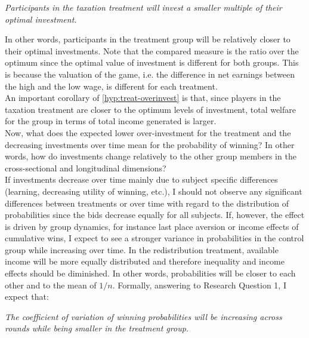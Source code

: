     \begin{tcolorbox}[colback=UniVieGrau!15!white, colframe=white] 
    \begin{hyp} \label{hyp:treat-overinvest}
    \textit{Participants in the taxation treatment will invest a smaller multiple of their optimal investment.}
    \end{hyp}
    \end{tcolorbox}
    
    In other words, participants in the treatment group will be relatively closer to their optimal investments. Note that the compared measure is the ratio over the optimum since the optimal value of investment is different for both groups. This is because the valuation of the game, i.e. the difference in net earnings between the high and the low wage, is different for each treatment.\\ 
      
    An important corollary of \cref{hyp:treat-overinvest} is that, since players in the taxation treatment are closer to the optimum levels of investment, total welfare for the group in terms of total income generated is larger.\\
    
    Now, what does the expected lower over-investment for the treatment and the decreasing investments over time mean for the probability of winning? In other words, how do investments change relatively to the other group members in the cross-sectional and longitudinal dimensions?\\
    
    If investments decrease over time mainly due to subject specific differences (learning, decreasing utility of winning, etc.), I should not observe any significant differences between treatments or over time with regard to the distribution of probabilities since the bids decrease equally for all subjects. If, however, the effect is driven by group dynamics, for instance last place aversion or income effects of cumulative wins, I expect to see a stronger variance in probabilities in the control group while increasing over time. In the redistribution treatment, available income will be more equally distributed and therefore inequality and income effects should be diminished. In other words, probabilities will be closer to each other and to the mean of $1/n$. Formally, answering to Research Question 1, I expect that:
    
    \begin{tcolorbox}[colback=UniVieGrau!15!white, colframe=white] 
    \begin{hyp}\label{hyp:wins}
    \textit{The coefficient of variation of winning probabilities will be increasing across rounds while being smaller in the treatment group.}
    \end{hyp}
    \end{tcolorbox}
    
